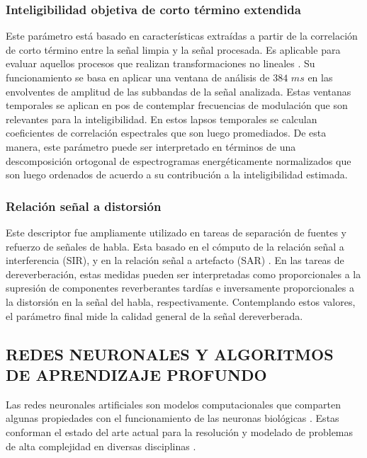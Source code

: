 \subsubsection{Inteligibilidad objetiva de corto término extendida}
Este parámetro está basado en características extraídas a partir de la correlación de corto término entre la señal limpia y la señal procesada. Es aplicable para evaluar aquellos procesos que realizan transformaciones no lineales \cite{ESTOI}. Su funcionamiento se basa en aplicar una ventana de análisis de $384$ $ms$ en las envolventes de amplitud de las subbandas de la señal analizada. Estas ventanas temporales se aplican en pos de contemplar frecuencias de modulación que son relevantes para la inteligibilidad. En estos lapsos temporales se calculan coeficientes de correlación espectrales que son luego promediados. De esta manera, este parámetro puede ser interpretado en términos de una descomposición ortogonal de espectrogramas energéticamente normalizados que son luego ordenados de acuerdo a su contribución a la inteligibilidad estimada. 

\subsubsection{Relación señal a distorsión}

Este descriptor fue ampliamente utilizado en tareas de separación de fuentes y refuerzo de señales de habla. Esta basado en el cómputo de la relación señal a interferencia (SIR), y en la relación señal a artefacto (SAR) \cite{SAR}. En las tareas de dereverberación, estas medidas pueden ser interpretadas como proporcionales a la supresión de componentes reverberantes tardías e inversamente proporcionales a la distorsión en la señal del habla, respectivamente. Contemplando estos valores, el parámetro final mide la calidad general de la señal dereverberada.  

\subsection[Redes neuronales y algoritmos de aprendizaje profundo]{REDES NEURONALES Y ALGORITMOS DE APRENDIZAJE PROFUNDO}
Las redes neuronales artificiales son modelos computacionales que comparten algunas propiedades con el funcionamiento de las neuronas biológicas  \cite{neurona}. Estas conforman el estado del arte actual para la resolución y modelado de problemas de alta complejidad en diversas disciplinas \cite{ANN_intro}. 


